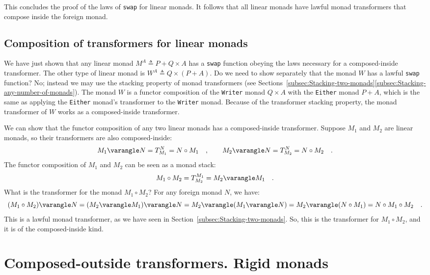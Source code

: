 This concludes the proof of the laws of \lstinline!swap! for linear
monads. It follows that all linear monads have lawful monad transformers
that compose inside the foreign monad.

\subsection{Composition of transformers for linear monads}

We have just shown that any linear monad $M^{A}\triangleq P+Q\times A$
has a \lstinline!swap! function obeying the laws necessary for a
composed-inside transformer. The other type of linear monad is $W^{A}\triangleq Q\times\left(P+A\right)$.
Do we need to show separately that the monad $W$ has a lawful \lstinline!swap!
function? No; instead we may use the stacking property of monad transformers
(see Sections~\ref{subsec:Stacking-two-monads}\textendash \ref{subsec:Stacking-any-number-of-monads}).
The monad $W$ is a functor composition of the \lstinline!Writer!
monad $Q\times A$ with the \lstinline!Either! monad $P+A$, which
is the same as applying the \lstinline!Either! monad\textsf{'}s transformer
to the \lstinline!Writer! monad. Because of the transformer stacking
property, the monad transformer of $W$ works as a composed-inside
transformer.

We can show that the functor composition of any two linear monads
has a composed-inside transformer. Suppose $M_{1}$ and $M_{2}$ are
linear monads, so their transformers are also composed-inside:
\[
M_{1}\varangle N=T_{M_{1}}^{N}=N\circ M_{1}\quad,\quad\quad M_{2}\varangle N=T_{M_{2}}^{N}=N\circ M_{2}\quad.
\]
The functor composition of $M_{1}$ and $M_{2}$ can be seen as a
monad stack:
\[
M_{1}\circ M_{2}=T_{M_{2}}^{M_{1}}=M_{2}\varangle M_{1}\quad.
\]
What is the transformer for the monad $M_{1}\circ M_{2}$? For any
foreign monad $N$, we have:
\[
(M_{1}\circ M_{2})\varangle N=(M_{2}\varangle M_{1})\varangle N=M_{2}\varangle(M_{1}\varangle N)=M_{2}\varangle(N\circ M_{1})=N\circ M_{1}\circ M_{2}\quad.
\]
This is a lawful monad transformer, as we have seen in Section~\ref{subsec:Stacking-two-monads}.
So, this is the transformer for $M_{1}\circ M_{2}$, and it is of
the composed-inside kind.

\section{Composed-outside transformers. Rigid monads\label{sec:transformers-rigid-monads}}

